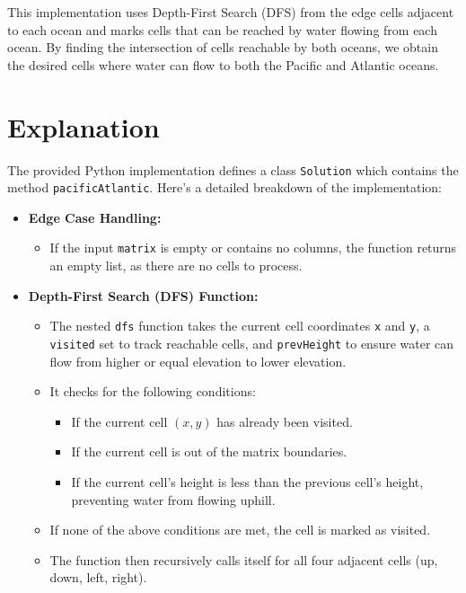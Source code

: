 This implementation uses Depth-First Search (DFS) from the edge cells adjacent to each ocean and marks cells that can be reached by water flowing from each ocean. By finding the intersection of cells reachable by both oceans, we obtain the desired cells where water can flow to both the Pacific and Atlantic oceans.

\section*{Explanation}

The provided Python implementation defines a class \texttt{Solution} which contains the method \texttt{pacificAtlantic}. Here's a detailed breakdown of the implementation:

\begin{itemize}
    \item \textbf{Edge Case Handling:}
    \begin{itemize}
        \item If the input \texttt{matrix} is empty or contains no columns, the function returns an empty list, as there are no cells to process.
    \end{itemize}
    
    \item \textbf{Depth-First Search (DFS) Function:}
    \begin{itemize}
        \item The nested \texttt{dfs} function takes the current cell coordinates \texttt{x} and \texttt{y}, a \texttt{visited} set to track reachable cells, and \texttt{prevHeight} to ensure water can flow from higher or equal elevation to lower elevation.
        \item It checks for the following conditions:
        \begin{itemize}
            \item If the current cell \((x, y)\) has already been visited.
            \item If the current cell is out of the matrix boundaries.
            \item If the current cell's height is less than the previous cell's height, preventing water from flowing uphill.
        \end{itemize}
        \item If none of the above conditions are met, the cell is marked as visited.
        \item The function then recursively calls itself for all four adjacent cells (up, down, left, right).
    \end{itemize}
    

\end{itemize}
